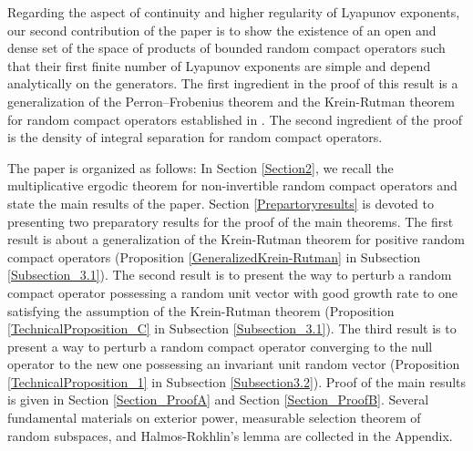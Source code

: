 \documentclass[pdflatex,sn-mathphys-num]{sn-jnl}%
\theoremstyle{thmstyleone}%
\theoremstyle{thmstyletwo}%
\theoremstyle{thmstylethree}%
\numberwithin{equation}{section}
\begin{document}
 

Regarding the aspect of continuity and higher regularity of Lyapunov exponents, our second contribution of the paper is to show the existence of an open and dense set of the space of products of bounded random compact operators such that their first finite number of Lyapunov exponents are simple and depend analytically on the generators. The first ingredient in the proof of this result is a generalization of the Perron–Frobenius theorem and the Krein-Rutman theorem for random compact operators established in \cite{Dubois,Ruelle1979}. The second ingredient of the proof is the density of integral separation for random compact operators. 
%

The paper is organized as follows: In Section \ref{Section2}, we recall the multiplicative ergodic theorem for non-invertible random compact operators and state the main results of the paper. Section \ref{Prepartoryresults} is devoted to presenting two preparatory results for the proof of the main theorems. The first result is about a generalization of the Krein-Rutman theorem for positive random compact operators (Proposition \ref{GeneralizedKrein-Rutman} in Subsection \ref{Subsection_3.1}). The second result is to present the way to perturb a random compact operator possessing a random unit vector with good growth rate to one satisfying the assumption of the Krein-Rutman theorem (Proposition \ref{TechnicalProposition_C} in Subsection \ref{Subsection_3.1}). The third result is to present a way to perturb a random compact operator converging to the null operator to the new one possessing an invariant unit random vector (Proposition \ref{TechnicalProposition_1} in Subsection \ref{Subsection3.2}). Proof of the main results is given in Section \ref{Section_ProofA} and Section \ref{Section_ProofB}. Several fundamental materials on exterior power, measurable selection theorem of random subspaces, and Halmos-Rokhlin's lemma are collected in the Appendix.  
%
%
%
%
%
%
%
%
\end{document}
